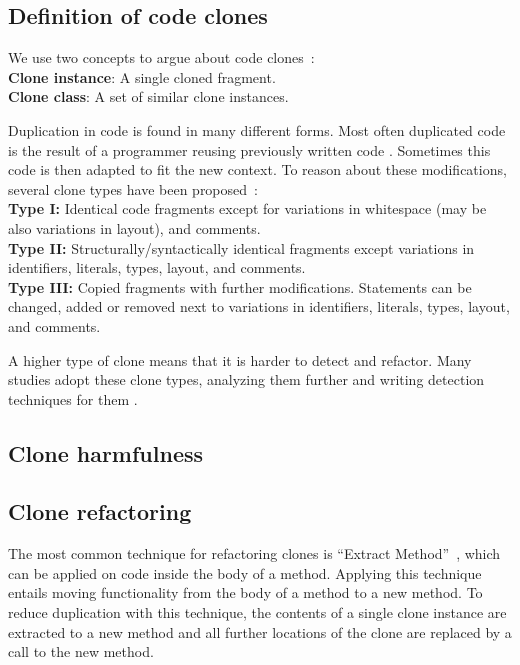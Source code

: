 \documentclass[sigconf,review,anonymous]{acmart}
\begin{document}
\subsection{Definition of code clones}
We use two concepts to argue about code clones~\cite{roy2007survey}:
\\ \textbf{Clone instance}: A single cloned fragment.
\\ \textbf{Clone class}: A set of similar clone instances.

Duplication in code is found in many different forms. Most often duplicated code is the result of a programmer reusing previously written code \cite{haefliger2008code, baxter1998clone}. Sometimes this code is then adapted to fit the new context. To reason about these modifications, several clone types have been proposed~\cite{roy2007survey}:\\
\textbf{Type I:} Identical code fragments except for variations in whitespace (may be also variations in layout), and comments.\\
\textbf{Type II:} Structurally/syntactically identical fragments except variations in identifiers, literals, types, layout, and comments.\\
\textbf{Type III:} Copied fragments with further modifications. Statements can be changed, added or removed next to variations in identifiers, literals, types, layout, and comments.

A higher type of clone means that it is harder to detect and refactor. Many studies adopt these clone types, analyzing them further and writing detection techniques for them \cite{sajnani2016sourcerercc, kodhai2010detection, van2019novel}.

\subsection{Clone harmfulness}

\subsection{Clone refactoring}
The most common technique for refactoring clones is ``Extract Method''~\cite{fowler2018refactoring}, which can be applied on code inside the body of a method. Applying this technique entails moving functionality from the body of a method to a new method. To reduce duplication with this technique, the contents of a single clone instance are extracted to a new method and all further locations of the clone are replaced by a call to the new method.
\end{document}
